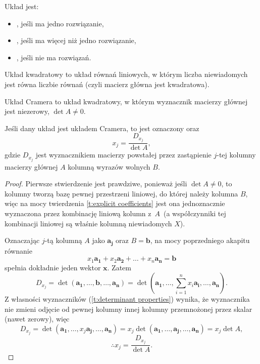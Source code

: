 \begin{definition}
    Układ jest:
    \begin{itemize}
        \item {}, jeśli ma jedno rozwiązanie,
        \item {}, jeśli ma więcej niż jedno rozwiązanie,
        \item {}, jeśli nie ma rozwiązań.
    \end{itemize}
\end{definition}

\begin{definition}
    Układ kwadratowy to układ równań liniowych, w którym liczba niewiadomych jest równa liczbie równań (czyli macierz główna jest kwadratowa).
\end{definition}

\begin{definition}
    Układ Cramera to układ kwadratowy, w którym wyznacznik macierzy głównej jest niezerowy, $\det A \neq 0$.
\end{definition}

\begin{theorem}[Cramera]
    \label{t:Cramer}
    Jeśli dany układ jest układem Cramera, to jest oznaczony oraz
    \[ x_j = \frac{D_{x_j}}{\det A}, \]
    gdzie $D_{x_j}$ jest wyznacznikiem macierzy powstałej przez zastąpienie $j$-tej kolumny macierzy głównej $A$ kolumną wyrazów wolnych $B$.
\end{theorem}
\begin{proof}
    Pierwsze stwierdzenie jest prawdziwe, ponieważ jeśli $\det A \neq 0$, to kolumny tworzą bazę pewnej przestrzeni liniowej, do której należy kolumna $B$, więc na mocy twierdzenia \ref{t:explicit coefficients} jest ona jednoznacznie wyznaczona przez kombinację liniową kolumn z~$A$~(a współczynniki tej kombinacji liniowej są właśnie kolumną niewiadomych $X$).

    Oznaczając $j$-tą kolumną $A$ jako $\mathbf{a_j}$ oraz $B = \mathbf{b}$, na mocy poprzedniego akapitu równanie
    \[ x_1\mathbf{a_1} + x_2\mathbf{a_2} + \ldots + x_n\mathbf{a_n} = \mathbf{b} \]
    spełnia dokładnie jeden wektor $\mathbf{x}$. Zatem
    \[ D_{x_j} = \det(\mathbf{a_1}, \ldots, \mathbf{b}, \ldots, \mathbf{a_n}) = \det(\mathbf{a_1}, \ldots, \sum_{i=1}^n x_i\mathbf{a_i}, \ldots, \mathbf{a_n}). \]
    Z własności wyznaczników (\ref{t:determinant properties}) wynika, że wyznacznika nie zmieni odjęcie od pewnej kolumny innej kolumny przemnożonej przez skalar (nawet zerowy), więc
    \[ D_{x_j} = \det(\mathbf{a_1}, \ldots, x_j\mathbf{a_j}, \ldots, \mathbf{a_n}) = x_j\det(\mathbf{a_1}, \ldots, \mathbf{a_j}, \ldots, \mathbf{a_n}) = x_j \det A, \]
    \[ \therefore x_j = \frac{D_{x_j}}{\det A}. \]
\end{proof}

